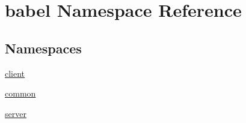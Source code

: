 \hypertarget{namespacebabel}{}\section{babel Namespace Reference}
\label{namespacebabel}
\subsection*{Namespaces}
\begin{DoxyCompactItemize}
\item 
 \mbox{\hyperlink{namespacebabel_1_1client}{client}}
\item 
 \mbox{\hyperlink{namespacebabel_1_1common}{common}}
\item 
 \mbox{\hyperlink{namespacebabel_1_1server}{server}}
\end{DoxyCompactItemize}
